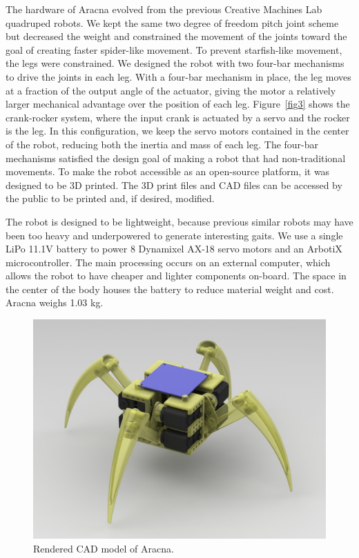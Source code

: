 \documentclass[letterpaper]{article}
\begin{document}
The hardware of Aracna evolved from the previous Creative Machines Lab
quadruped robots. We kept the same two degree of freedom pitch joint
scheme but decreased the weight and constrained the movement of the
joints toward the goal of creating faster spider-like movement. To
prevent starfish-like movement, the legs were constrained. We designed
the robot with two four-bar mechanisms to drive the joints in each
leg. With a four-bar mechanism in place, the leg moves at a fraction
of the output angle of the actuator, giving the motor a relatively
larger mechanical advantage over the position of each leg.
Figure~\ref{fig3} shows the crank-rocker system, where the input crank
is actuated by a servo and the rocker is the leg. In this
configuration, we keep the servo motors contained in the center of the
robot, reducing both the inertia and mass of each leg. The four-bar
mechanisms satisfied the design goal of making a robot that had
non-traditional movements.  To make the robot
accessible as an open-source platform, it was designed to be 3D
printed. The 3D print files and CAD files can be accessed by the
public to be printed and, if desired, modified.

The robot is designed to be lightweight, because previous similar
robots may have been too heavy and underpowered to generate
interesting gaits. We use a single LiPo 11.1V battery to
power 8 Dynamixel AX-18 servo motors and an ArbotiX
microcontroller. The main processing occurs on an external computer,
which allows the robot to have cheaper and lighter components
on-board. The space in the center of the body houses the
battery to reduce material weight and cost. Aracna weighs 1.03 kg.

\begin{figure}[t]
\begin{center}
\includegraphics[width=\columnwidth]{fig5.jpg}
\caption{Rendered CAD model of Aracna.}
\label{fi52}
\end{center}
\end{figure}
\end{document}
